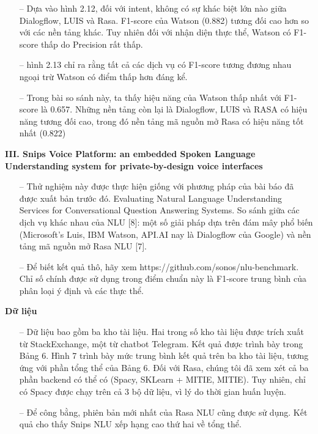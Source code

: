 \begin{itemize}
    \item[--] Dựa vào hình 2.12, đối với intent, không có sự khác biệt lớn nào giữa Dialogflow, LUIS và Rasa. F1-score của Watson (0.882) tương đối cao hơn so với các nền tảng khác. Tuy nhiên đối với nhận diện thực thể, Watson có F1-score thấp do Precision rất thấp.
    \item[--] hình 2.13 chỉ ra rằng tất cả các dịch vụ có F1-score tương đương nhau ngoại trừ Watson có điểm thấp hơn đáng kể.
    \item[--] Trong bài so sánh này, ta thấy hiệu năng của Watson thấp nhất với F1-score là 0.657. Những nền tảng còn lại là Dialogflow, LUIS và RASA có hiệu năng tương đối cao, trong đó nền tảng mã nguồn mở Rasa có hiệu năng tốt nhất (0.822)
\end{itemize}

\textbf{III. Snips Voice Platform: an embedded Spoken Language Understanding system for private-by-design voice interfaces}

\begin{itemize}
    \item[--] Thử nghiệm này được thực hiện giống với phương pháp của bài báo đã được xuất bản trước đó. Evaluating Natural Language Understanding Services for Conversational Question Answering Systems. So sánh giữa các dịch vụ khác nhau của NLU [8]: một số giải pháp dựa trên đám mây phổ biến (Microsoft’s Luis, IBM Watson, API.AI nay là Dialogflow của Google) và nền tảng mã nguồn mở Rasa NLU [7].
    \item[--] Để biết kết quả thô, hãy xem https://github.com/sonos/nlu-benchmark. Chỉ số chính được sử dụng trong điểm chuẩn này là F1-score trung bình của phân loại ý định và các thực thể.
\end{itemize}

\textbf{Dữ liệu}
\begin{itemize}
    \item[--] Dữ liệu bao gồm ba kho tài liệu. Hai trong số kho tài liệu được trích xuất từ StackExchange, một từ chatbot Telegram. Kết quả được trình bày trong Bảng 6. Hình 7 trình bày mức trung bình kết quả trên ba kho tài liệu, tương ứng với phần tổng thể của Bảng 6. Đối với Rasa, chúng tôi đã xem xét cả ba phần backend có thể có (Spacy, SKLearn + MITIE, MITIE). Tuy nhiên, chỉ có Spacy được chạy trên cả 3 bộ dữ liệu, vì lý do thời gian huấn luyện.
    \item[--] Để công bằng, phiên bản mới nhất của Rasa NLU cũng được sử dụng. Kết quả cho thấy Snips NLU xếp hạng cao thứ hai về tổng thể.
\end{itemize}

